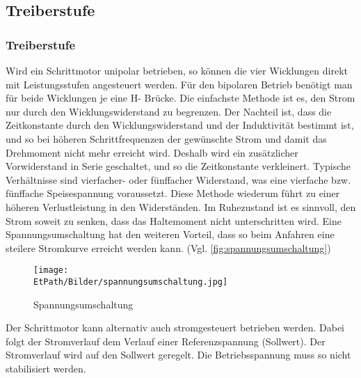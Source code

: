     \ifSTANDALONE
    \subsection{Treiberstufe}
    \fi
    \ifEMBED
    \subsubsection{Treiberstufe}
    \fi 
    	Wird ein Schrittmotor unipolar betrieben, so können die vier Wicklungen direkt mit Leistungsstufen angesteuert werden. Für den bipolaren Betrieb benötigt man für beide Wicklungen je eine H- Brücke. Die einfachste Methode ist es, den Strom nur durch den Wicklungswiderstand zu begrenzen. Der Nachteil ist, dass die Zeitkonstante durch den Wicklungswiderstand und der Induktivität bestimmt ist, und so bei höheren Schrittfrequenzen der gewünschte Strom und damit das Drehmoment nicht mehr erreicht wird. Deshalb wird ein zusätzlicher Vorwiderstand in Serie geschaltet, und so die Zeitkonstante verkleinert. Typische Verhältnisse sind vierfacher- oder fünffacher Widerstand, was eine vierfache bzw. fünffache Speisespannung voraussetzt. Diese Methode wiederum führt zu einer höheren Verlustleistung in den Widerständen. Im Ruhezustand ist es sinnvoll, den Strom soweit zu senken, dass das Haltemoment nicht unterschritten wird. Eine Spannungsumschaltung hat den weiteren Vorteil, dass so beim Anfahren eine steilere Stromkurve erreicht werden kann. (Vgl. \autoref{fig:spannungsumschaltung})
    	 \begin{figure}
    	 	\centering
    	 	\texttt{[image: \\EtPath/Bilder/spannungsumschaltung.jpg]}
    	 	\caption{Spannungsumschaltung}
    	 	\label{fig:spannungsumschaltung}
    	 \end{figure}
    	Der Schrittmotor kann alternativ auch stromgesteuert betrieben werden. Dabei folgt der Stromverlauf dem Verlauf einer Referenzspannung (Sollwert). Der Stromverlauf wird auf den Sollwert geregelt. Die Betriebsspannung muss so nicht stabilisiert werden. \label{stromgesteuert} 
	
	
		
